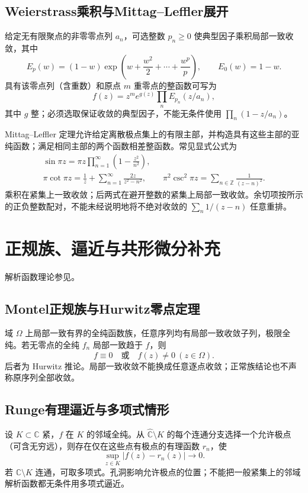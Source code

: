 \documentclass[../main.tex]{subfiles}
\begin{document}
\subsection{Weierstrass乘积与Mittag--Leffler展开}
给定无有限聚点的非零零点列 $a_n$，可选整数 $p_n\ge0$ 使典型因子乘积局部一致收敛，其中
\[
E_p(w)=(1-w)\exp\!\left(w+\frac{w^2}2+\cdots+\frac{w^p}p\right),\qquad E_0(w)=1-w.
\]
具有该零点列（含重数）和原点 $m$ 重零点的整函数可写为
\[
f(z)=z^me^{g(z)}\prod_nE_{p_n}(z/a_n),
\]
其中 $g$ 整；必须选取保证收敛的典型因子，不能无条件使用 $\prod_n(1-z/a_n)$。

Mittag--Leffler 定理允许给定离散极点集上的有限主部，并构造具有这些主部的亚纯函数；满足相同主部的两个函数相差整函数。常见显式公式为
\begin{gather*}
\sin\pi z=\pi z\prod_{n=1}^\infty\left(1-\frac{z^2}{n^2}\right),\\
\pi\cot\pi z=\frac1z+\sum_{n=1}^\infty\frac{2z}{z^2-n^2},\qquad
\pi^2\csc^2\pi z=\sum_{n\in\mathbb Z}\frac1{(z-n)^2}.
\end{gather*}
乘积在紧集上一致收敛；后两式在避开整数的紧集上局部一致收敛。余切项按所示的正负整数配对，不能未经说明地将不绝对收敛的 $\sum_n1/(z-n)$ 任意重排。
\section{正规族、逼近与共形微分补充}
解析函数理论参见\cite{complex,dlmf}。
\subsection{Montel正规族与Hurwitz零点定理}
域 $\Omega$ 上局部一致有界的全纯函数族，任意序列均有局部一致收敛子列，极限全纯。若无零点的全纯 $f_n$ 局部一致趋于 $f$，则
\[
f\equiv0\quad\text{或}\quad f(z)\ne0\ (z\in\Omega).
\]
后者为 Hurwitz 推论。局部一致收敛不能换成任意逐点收敛；正常族结论也不声称原序列全部收敛。
\subsection{Runge有理逼近与多项式情形}
设 $K\subset\mathbb C$ 紧，$f$ 在 $K$ 的邻域全纯。从 $\widehat{\mathbb C}\setminus K$ 的每个连通分支选择一个允许极点（可含无穷远），则存在仅在这些点有极点的有理函数 $r_n$，使
\[
\sup_{z\in K}|f(z)-r_n(z)|\longrightarrow0.
\]
若 $\mathbb C\setminus K$ 连通，可取多项式。孔洞影响允许极点的位置；不能把一般紧集上的邻域解析函数都无条件用多项式逼近。
\end{document}
